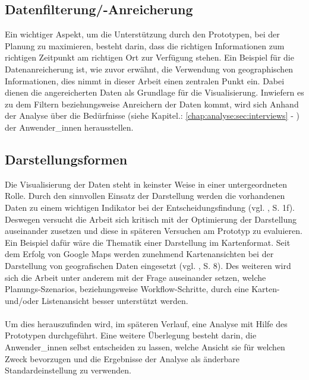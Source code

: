 \documentclass[Bachelorarbeit.tex]{subfiles}
\begin{document}
\subsection*{Datenfilterung/-Anreicherung}
Ein wichtiger Aspekt, um die Unterstützung durch den Prototypen, bei der Planung zu maximieren, besteht darin, dass die richtigen Informationen zum richtigen Zeitpunkt am richtigen Ort zur Verfügung stehen. 
Ein Beispiel für die Datenanreicherung ist, wie zuvor erwähnt, die Verwendung von geographischen Informationen, dies nimmt in dieser Arbeit einen zentralen Punkt ein. 
Dabei dienen die angereicherten Daten als Grundlage für die Visualisierung.
Inwiefern es zu dem Filtern beziehungsweise Anreichern der Daten kommt, wird sich Anhand der Analyse über die Bedürfnisse (siehe Kapitel.: \ref{chap:analyse:sec:interviews} - ) der Anwender\_innen herausstellen.

\subsection*{Darstellungsformen}
Die Visualisierung der Daten steht in keinster Weise in einer untergeordneten Rolle.
Durch den sinnvollen Einsatz der Darstellung werden die vorhandenen Daten zu einem wichtigen Indikator bei der Entscheidungsfindung (vgl. \cite{Reiterer2000}, S. 1f).
Deswegen versucht die Arbeit sich kritisch mit der Optimierung der Darstellung auseinander zusetzen und diese in späteren Versuchen am Prototyp zu evaluieren.
Ein Beispiel dafür wäre die Thematik einer Darstellung im Kartenformat.
Seit dem Erfolg von Google Maps werden zunehmend Kartenansichten bei der Darstellung von geografischen Daten eingesetzt (vgl. \cite{Mitchell2008}, S. 8). 
Des weiteren wird sich die Arbeit unter anderem mit der Frage auseinander setzen, welche Planungs-Szenarios, beziehungsweise Workflow-Schritte, durch eine Karten- und/oder Listenansicht besser unterstützt werden.\\
\\
Um dies herauszufinden wird, im späteren Verlauf, eine Analyse mit Hilfe des Prototypen durchgeführt.
Eine weitere Überlegung besteht darin, die Anwender\_innen selbst entscheiden zu lassen, welche Ansicht sie für welchen Zweck bevorzugen und die Ergebnisse der Analyse als änderbare Standardeinstellung zu verwenden.
\end{document}
